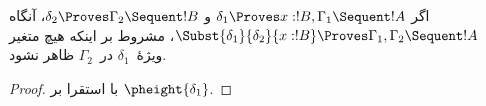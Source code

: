 \documentclass[../../../include/open-logic-section]{subfiles}
\begin{document}
\begin{prop}
اگر $\delta_1 \Proves x:!B, \Gamma_1 \Sequent !A$ و
$\delta_2 \Proves \Gamma_2 \Sequent !B$، آنگاه
$\Subst{\delta_1}{\delta_2}{x:!B}
 \Proves \Gamma_1, \Gamma_2 \Sequent !A$، مشروط بر اینکه هیچ متغیر
ویژهٔ~$\delta_1$ در~$\Gamma_2$ ظاهر نشود.
\end{prop}

\begin{proof}
با استقرا بر $\pheight{\delta_1}$.
\end{proof}
\end{document}
